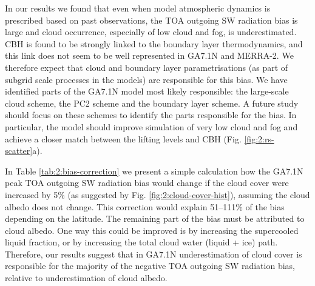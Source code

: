 In our results we found that even when model atmospheric dynamics is prescribed
based on past observations, the TOA outgoing SW radiation bias is large and
cloud occurrence, especially of low cloud and fog, is underestimated. CBH is
found to be strongly linked to the boundary layer thermodynamics, and this link
does not seem to be well represented in GA7.1N and MERRA-2. We therefore expect
that cloud and boundary layer parametrisations (as part of subgrid scale
processes in the models) are responsible for this bias. We have identified
parts of the GA7.1N model most likely responsible: the large-scale cloud scheme,
the PC2 scheme \citep{wilson2008a,wilson2008b} and the boundary layer scheme. A
future study should focus on these schemes to identify the parts responsible
for the bias. In particular, the model should improve simulation of very low
cloud and fog and achieve a closer match between the lifting levels and CBH
(Fig. \ref{fig:2:rs-scatter}a).

\begin{table}[t]
\caption[A table showing a "back-of-the-envelope" calculation]{
A table showing a "back-of-the-envelope" calculation how the GA7.1N peak TOA
outgoing SW radiation bias (Fig. \ref{fig:2:sw_up_toa_time}) would change if
the cloud cover were increased by 5\% (Fig. \ref{fig:2:cloud-cover-hist}),
asssuming the cloud albedo does not change. The "corrected" TOA outgoing SW
radiation is calculated by multiplying the original value by 1.05.
}
\label{tab:2:bias-correction}
\centering
{}
\end{table}

In Table \ref{tab:2:bias-correction} we present a simple calculation how the
GA7.1N peak TOA outgoing SW radiation bias would change if the cloud cover were
increased by 5\% (as suggested by Fig. \ref{fig:2:cloud-cover-hist}), assuming
the cloud albedo does not change. This correction would explain 51--111\% of
the bias depending on the latitude. The remaining part of the bias must be
attributed to cloud albedo. One way this could be improved is by increasing the
supercooled liquid fraction, or by increasing the total cloud water (liquid +
ice) path. Therefore, our results suggest that in GA7.1N underestimation of
cloud cover is responsible for the majority of the negative TOA outgoing SW
radiation bias, relative to underestimation of cloud albedo.

